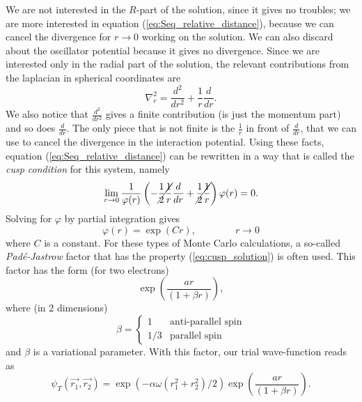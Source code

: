 We are not interested in the $R$-part of the solution, since it gives no troubles; we are more interested in equation (\ref{eq:Seq_relative_distance}), because we can cancel the divergence for $r \to 0$ working on the solution. We can also discard about the oscillator potential because it gives no divergence. Since we are interested only in the radial part of the solution, the relevant contributions from the laplacian in spherical coordinates are
\begin{equation}
    \nabla^2_r = \frac{d^2}{dr^2} + \frac{1}{r}\frac{d}{dr}.
\end{equation}
We also notice that $\frac{d^2}{dr^2}$ gives a finite contribution (is just the momentum part) and so does $\frac{d}{dr}$. The only piece that is not finite is the $\frac{1}{r}$ in front of $\frac{d}{dr}$, that we can use to cancel the divergence in the interaction potential. Using these facts, equation (\ref{eq:Seq_relative_distance}) can be rewritten in a way that is called the \emph{cusp condition} for this system, namely
\begin{equation}
    \lim_{r \to 0} \frac{1}{\varphi(r)}\left( -\cancel{\frac{1}{2}\frac{1}{r}}\frac{d}{dr} + \cancel{\frac{1}{2}\frac{1}{r}} \right)\varphi(r) = 0.
\end{equation}
Solving for $\varphi$ by partial integration gives
\begin{equation}
    \varphi(r) = \exp(Cr),
    \qquad\qquad
    r \to 0
    \label{eq:cusp_solution}
\end{equation}
where $C$ is a constant. For these types of Monte Carlo calculations, a so-called \emph{Padé-Jastrow} factor that has the property (\ref{eq:cusp_solution}) is often used. This factor has the form (for two electrons)
\begin{equation}
    \exp\left( \frac{ar}{(1+\beta r)} \right),
\end{equation}
where (in 2 dimensions)
\begin{equation}
    \beta = 
    \begin{cases}
    1 & \text{anti-parallel spin} \\
    1/3 & \text{parallel spin}
    \end{cases}
\end{equation}
and $\beta$ is a variational parameter. With this factor, our trial wave-function reads as
\begin{equation}
    \psi_T(\vec{r_1},\vec{r_2}) = \exp\left(-\alpha\omega\left(r_1^2 + r_2^2\right)/2\right)\exp\left( \frac{ar}{(1+\beta r)} \right).
    \label{eq:wf_2e}
\end{equation}

